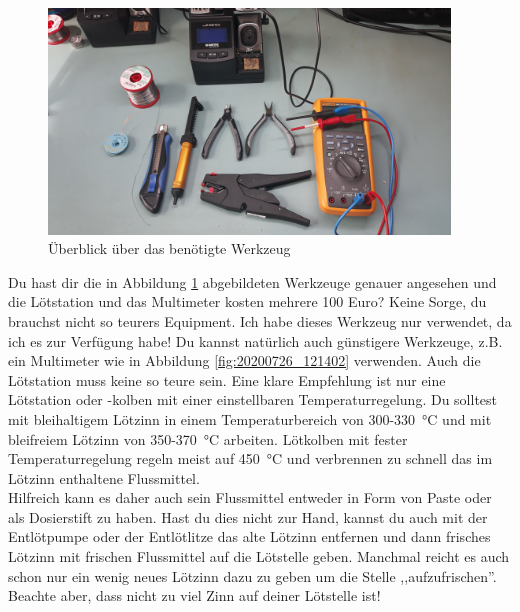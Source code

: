 \documentclass[12pt, a4paper]{article}		%
\begin{document}
\begin{figure}[H]
	\centering
		\includegraphics[width=0.95\textwidth]{Grafiken/20200726_121811.jpg}
	\caption{Überblick über das benötigte Werkzeug}
	\label{fig:20200726_121811}
\end{figure}

Du hast dir die in Abbildung \ref{fig:20200726_121811} abgebildeten Werkzeuge genauer angesehen und die Lötstation und das Multimeter kosten mehrere 100 Euro? Keine Sorge, du brauchst nicht so teurers Equipment. Ich habe dieses Werkzeug nur verwendet, da ich es zur Verfügung habe! Du kannst natürlich auch günstigere Werkzeuge, z.B. ein Multimeter wie in Abbildung \ref{fig:20200726_121402} verwenden. Auch die Lötstation muss keine so teure sein. Eine klare Empfehlung ist nur eine Lötstation oder -kolben mit einer einstellbaren Temperaturregelung. Du solltest mit bleihaltigem Lötzinn in einem Temperaturbereich von 300-\SI{330}{\degreeCelsius} und mit bleifreiem Lötzinn von 350-\SI{370}{\degreeCelsius} arbeiten. Lötkolben mit fester Temperaturregelung regeln meist auf \SI{450}{\degreeCelsius} und verbrennen zu schnell das im Lötzinn enthaltene Flussmittel.\\
Hilfreich kann es daher auch sein Flussmittel entweder in Form von Paste oder als Dosierstift zu haben. Hast du dies nicht zur Hand, kannst du auch mit der Entlötpumpe oder der Entlötlitze das alte Lötzinn entfernen und dann frisches Lötzinn mit frischen Flussmittel auf die Lötstelle geben. Manchmal reicht es auch schon nur ein wenig neues Lötzinn dazu zu geben um die Stelle ,,aufzufrischen''. Beachte aber, dass nicht zu viel Zinn auf deiner Lötstelle ist!
\end{document}
